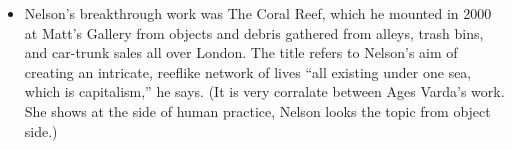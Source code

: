 \begin{itemize}

\item Nelson’s breakthrough work was The Coral Reef, which he mounted in 2000 at Matt’s Gallery from objects and debris gathered from alleys, trash bins, and car-trunk sales all over London. The title refers to Nelson’s aim of creating an intricate, reeflike network of lives “all existing under one sea, which is capitalism,” he says. (It is very corralate between Ages Varda's work. She shows at the side of human practice, Nelson looks the topic from object side.)



\end{itemize}
